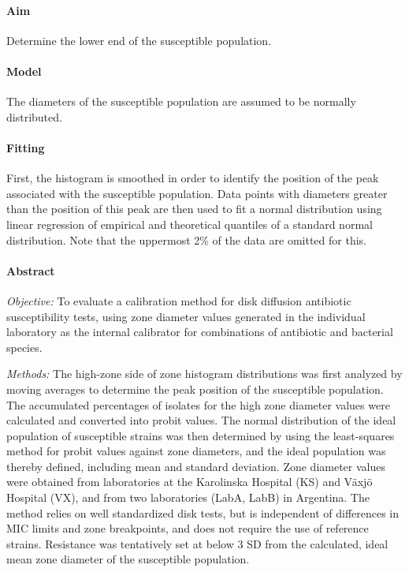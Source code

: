 \documentclass[a4paper]{article}
\begin{document}
\paragraph{Aim} Determine the lower end of the susceptible population.
\paragraph{Model} The diameters of the susceptible population are assumed to be normally distributed.
\paragraph{Fitting} First, the histogram is smoothed in order to identify the position of the peak associated with the susceptible population. Data points with diameters greater than the position of this peak are then used to fit a normal distribution using linear regression of empirical and theoretical quantiles of a standard normal distribution. Note that the uppermost 2\% of the data are omitted for this.
\paragraph{Abstract} \emph{Objective:} To evaluate a calibration method for disk diffusion antibiotic susceptibility tests, using zone diameter values generated in the individual laboratory as the internal calibrator for combinations of antibiotic and bacterial species.

\emph{Methods:} The high-zone side of zone histogram distributions was first analyzed by moving averages to determine the peak position of the susceptible population. The accumulated percentages of isolates for the high zone diameter values were calculated and converted into probit values. The normal distribution of the ideal population of susceptible strains was then determined by using the least-squares method for probit values against zone diameters, and the ideal population was thereby defined, including mean and standard deviation. Zone diameter values were obtained from laboratories at the Karolinska Hospital (KS) and Växjö Hospital (VX), and from two laboratories (LabA, LabB) in Argentina. The method relies on well standardized disk tests, but is independent of differences in MIC limits and zone breakpoints, and does not require the use of reference strains. Resistance was tentatively set at below 3 SD from the calculated, ideal mean zone diameter of the susceptible population.
\end{document}
